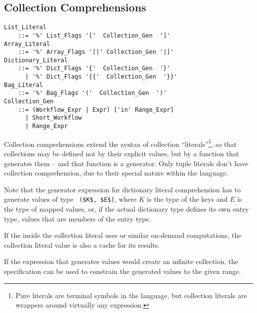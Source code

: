 



\subsection{Collection Comprehensions}
\label{sec:collection-comprehensions}

\grammar\begin{lstlisting}
List_Literal 
    ::= '%' List_Flags '['  Collection_Gen  ']'
Array_Literal 
    ::= '%' Array_Flags '[|' Collection_Gen '|]'
Dictionary_Literal 
    ::= '%' Dict_Flags '{'  Collection_Gen  '}'
      | '%' Dict_Flags '{{'  Collection_Gen  '}}'
Bag_Literal
    ::= '%' Bag_Flags '('  Collection_Gen  ')'
Collection_Gen
    ::= (Workflow_Expr | Expr) ['in' Range_Expr]
      | Short_Workflow
      | Range_Expr
\end{lstlisting}

Collection comprehensions extend the syntax of collection ``literals''\footnote{Pure literals are terminal symbols in the language, but collection literals are wrappers around virtually any expression.}, so that collections may be defined not by their explicit values, but by a function that generates them -- and that function is a generator. Only tuple literals don't have collection comprehension, due to their special nature within the language. 

Note that the generator expression for dictionary literal comprehension has to generate values of type ~\lstinline!($K$, $E$)!, where $K$ is the type of the keys and $E$ is the type of mapped values, or, if the actual dictionary type defines its own entry type, values that are members of the entry type. 

If the  inside the collection literal uses  or similar on-demand computations, the collection literal value is also a cache for its results. 

If the expression that generates values would create an infinite collection, the  specification can be used to constrain the generated values to the given range. 






